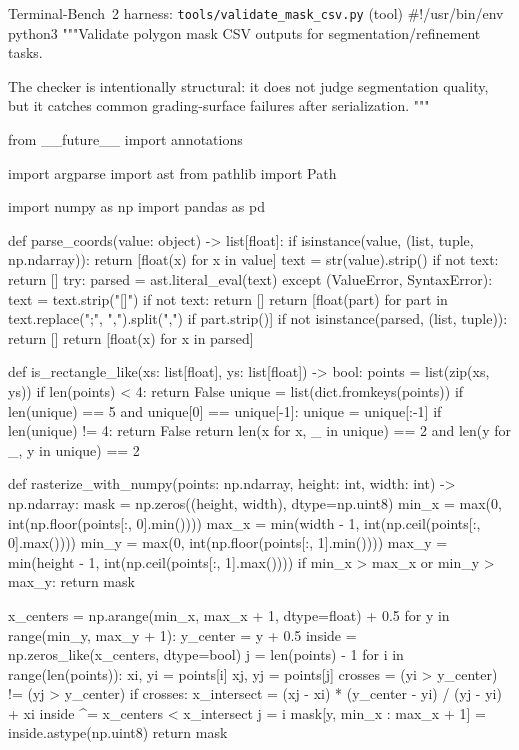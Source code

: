 \documentclass{llmxive}
\begin{document}
\begin{promptbox}{Terminal-Bench~2 harness: \texttt{tools/validate\_mask\_csv.py} (tool)}
#!/usr/bin/env python3
"""Validate polygon mask CSV outputs for segmentation/refinement tasks.

The checker is intentionally structural: it does not judge segmentation quality,
but it catches common grading-surface failures after serialization.
"""

from __future__ import annotations

import argparse
import ast
from pathlib import Path

import numpy as np
import pandas as pd


def parse_coords(value: object) -> list[float]:
    if isinstance(value, (list, tuple, np.ndarray)):
        return [float(x) for x in value]
    text = str(value).strip()
    if not text:
        return []
    try:
        parsed = ast.literal_eval(text)
    except (ValueError, SyntaxError):
        text = text.strip("[]")
        if not text:
            return []
        return [float(part) for part in text.replace(";", ",").split(",") if part.strip()]
    if not isinstance(parsed, (list, tuple)):
        return []
    return [float(x) for x in parsed]


def is_rectangle_like(xs: list[float], ys: list[float]) -> bool:
    points = list(zip(xs, ys))
    if len(points) < 4:
        return False
    unique = list(dict.fromkeys(points))
    if len(unique) == 5 and unique[0] == unique[-1]:
        unique = unique[:-1]
    if len(unique) != 4:
        return False
    return len({x for x, _ in unique}) == 2 and len({y for _, y in unique}) == 2


def rasterize_with_numpy(points: np.ndarray, height: int, width: int) -> np.ndarray:
    mask = np.zeros((height, width), dtype=np.uint8)
    min_x = max(0, int(np.floor(points[:, 0].min())))
    max_x = min(width - 1, int(np.ceil(points[:, 0].max())))
    min_y = max(0, int(np.floor(points[:, 1].min())))
    max_y = min(height - 1, int(np.ceil(points[:, 1].max())))
    if min_x > max_x or min_y > max_y:
        return mask

    x_centers = np.arange(min_x, max_x + 1, dtype=float) + 0.5
    for y in range(min_y, max_y + 1):
        y_center = y + 0.5
        inside = np.zeros_like(x_centers, dtype=bool)
        j = len(points) - 1
        for i in range(len(points)):
            xi, yi = points[i]
            xj, yj = points[j]
            crosses = (yi > y_center) != (yj > y_center)
            if crosses:
                x_intersect = (xj - xi) * (y_center - yi) / (yj - yi) + xi
                inside ^= x_centers < x_intersect
            j = i
        mask[y, min_x : max_x + 1] = inside.astype(np.uint8)
    return mask



\end{promptbox}
\end{document}
